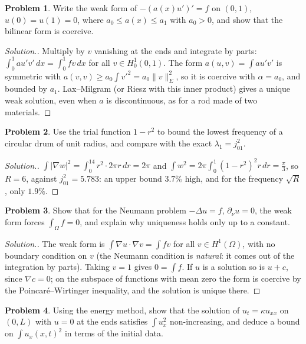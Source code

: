 \documentclass[11pt,a4paper]{article}
\numberwithin{equation}{section}
\theoremstyle{definition}
\newtheorem{problemx}{Problem}[subsection]
\newenvironment{problem}{\begin{problemx}}{\end{problemx}}
\newenvironment{solution}
  {\renewcommand{\qedsymbol}{}\begin{proof}[\textit{Solution}.]}
  {\end{proof}}
\begin{document}
\begin{problem}
Write the weak form of $-(a(x)u')' = f$ on $(0, 1)$, $u(0) = u(1) = 0$, where $a_0 \leq a(x) \leq a_1$ with $a_0 > 0$, and show that the bilinear form is coercive.
\end{problem}

\begin{solution}
Multiply by $v$ vanishing at the ends and integrate by parts: $\int_0^1au'v'\,dx = \int_0^1fv\,dx$ for all $v \in H^1_0(0, 1)$. The form $a(u, v) = \int au'v'$ is symmetric with $a(v, v) \geq a_0\int v'^2 = a_0\|v\|_E^2$, so it is coercive with $\alpha = a_0$, and bounded by $a_1$. Lax--Milgram (or Riesz with this
inner product) gives a unique weak solution, even when $a$ is discontinuous, as for a rod made of two materials.
\end{solution}

\begin{problem}
Use the trial function $1 - r^2$ to bound the lowest frequency of a circular drum of unit radius, and compare with the exact $\lambda_1 = j_{01}^2$.
\end{problem}

\begin{solution}
$\int|\nabla w|^2 = \int_0^14r^2\cdot 2\pi r\,dr = 2\pi$ and $\int w^2 = 2\pi\int_0^1(1 - r^2)^2r\,dr = \frac\pi3$, so $R = 6$, against $j_{01}^2 = 5.783$: an upper bound $3.7\%$ high, and for the frequency $\sqrt R$, only $1.9\%$.
\end{solution}

\begin{problem}
Show that for the Neumann problem $-\Delta u = f$, $\partial_\nu u = 0$, the weak form forces $\int_\Omega f = 0$, and explain why uniqueness holds only up to a constant.
\end{problem}

\begin{solution}
The weak form is $\int\nabla u\cdot\nabla v = \int fv$ for all $v \in H^1(\Omega)$, with no boundary condition on $v$ (the Neumann condition is \emph{natural}: it comes out of the integration by parts). Taking $v = 1$ gives $0 = \int f$. If $u$ is a solution so is $u + c$, since $\nabla c = 0$; on the subspace of functions with mean zero the
form is coercive by the Poincar\'e--Wirtinger inequality, and the solution is unique there.
\end{solution}

\begin{problem}
Using the energy method, show that the solution of $u_t = \kappa u_{xx}$ on $(0, L)$ with $u = 0$ at the ends satisfies $\int u_x^2$ non-increasing, and deduce a bound on $\int u_x(x, t)^2$ in terms of the initial data.
\end{problem}
\end{document}
